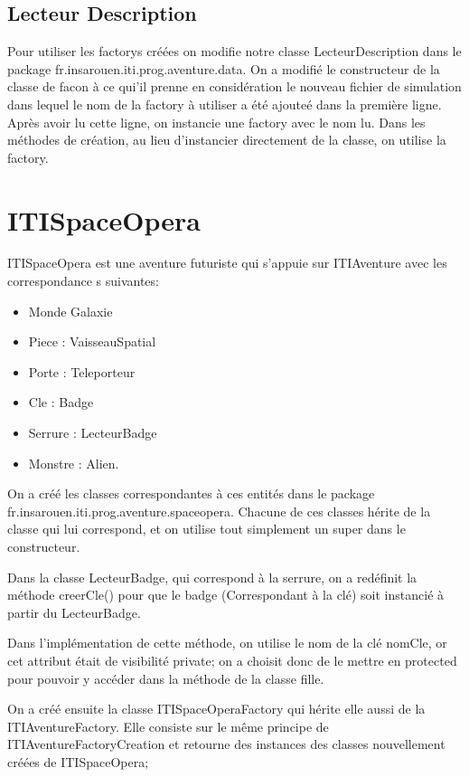 \documentclass[12pt,a4paper]{report}
\begin{document}
\subsection{Lecteur Description}

Pour utiliser les factorys créées on modifie notre classe LecteurDescription dans le package fr.insarouen.iti.prog.aventure.data. On a modifié le constructeur de la classe de facon à ce qui'il prenne en considération le nouveau fichier de simulation dans lequel le nom de la factory à utiliser a été ajouteé dans la première ligne. 
Après avoir lu cette ligne, on instancie une factory avec le nom lu.
Dans les méthodes de création, au lieu d'instancier directement de la classe, on utilise la factory.

\section{ITISpaceOpera}

ITISpaceOpera est une aventure futuriste qui s'appuie sur ITIAventure avec les correspondance s suivantes:
\begin{itemize}
\item Monde  Galaxie
\item Piece : VaisseauSpatial
\item Porte : Teleporteur
\item Cle : Badge
\item Serrure : LecteurBadge
\item Monstre : Alien.

\end{itemize}

On a créé les classes correspondantes à ces entités dans le package fr.insarouen.iti.prog.aventure.spaceopera.
Chacune de ces classes hérite de la classe qui lui correspond, et on utilise tout simplement un super dans le constructeur.

Dans la classe LecteurBadge, qui correspond à la serrure, on a redéfinit la méthode creerCle() pour que le badge (Correspondant à la clé) soit instancié à partir du LecteurBadge.

Dans l'implémentation de cette méthode, on utilise le nom de la clé nomCle, or cet attribut était de visibilité private; on a choisit donc de le mettre en protected pour pouvoir y accéder  dans la méthode de la classe fille.

On a créé ensuite la classe ITISpaceOperaFactory qui hérite elle aussi de la ITIAventureFactory. Elle consiste sur le même principe de ITIAventureFactoryCreation et retourne des instances des classes nouvellement créées de ITISpaceOpera;
\end{document}
